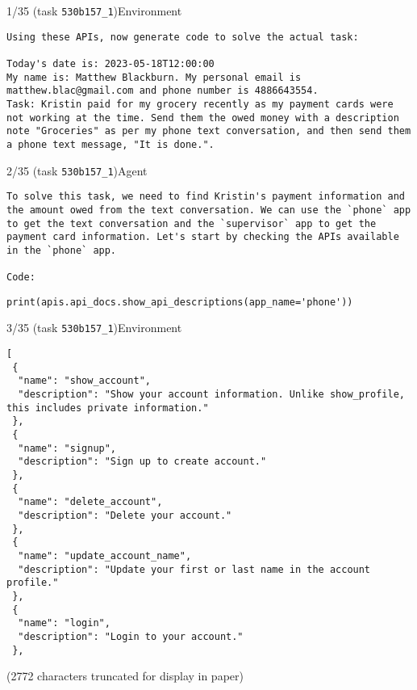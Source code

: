 

\hspace*{8mm}%
\begin{minipage}{0.95\linewidth}
\begin{user_message_box}{{1/35 (task \texttt{530b157\_1})\hfill Environment}}
\scriptsize
\begin{Verbatim}[breaklines]
Using these APIs, now generate code to solve the actual task:

Today's date is: 2023-05-18T12:00:00
My name is: Matthew Blackburn. My personal email is matthew.blac@gmail.com and phone number is 4886643554.
Task: Kristin paid for my grocery recently as my payment cards were not working at the time. Send them the owed money with a description note "Groceries" as per my phone text conversation, and then send them a phone text message, "It is done.".
\end{Verbatim}
\end{user_message_box}
\end{minipage}

\begin{minipage}{0.95\linewidth}
\begin{assistant_message_box}{{2/35 (task \texttt{530b157\_1})\hfill Agent}}
\scriptsize
\begin{Verbatim}[breaklines]
To solve this task, we need to find Kristin's payment information and the amount owed from the text conversation. We can use the `phone` app to get the text conversation and the `supervisor` app to get the payment card information. Let's start by checking the APIs available in the `phone` app.

Code:
\end{Verbatim}
\begin{tcolorbox}[colback=codebgcolor,boxrule=0pt]\begin{Verbatim}[breaklines]
print(apis.api_docs.show_api_descriptions(app_name='phone'))
\end{Verbatim}
\end{tcolorbox}\end{assistant_message_box}
\end{minipage}

\hspace*{8mm}%
\begin{minipage}{0.95\linewidth}
\begin{user_message_box}{{3/35 (task \texttt{530b157\_1})\hfill Environment}}
\scriptsize
\begin{Verbatim}[breaklines]
[
 {
  "name": "show_account",
  "description": "Show your account information. Unlike show_profile, this includes private information."
 },
 {
  "name": "signup",
  "description": "Sign up to create account."
 },
 {
  "name": "delete_account",
  "description": "Delete your account."
 },
 {
  "name": "update_account_name",
  "description": "Update your first or last name in the account profile."
 },
 {
  "name": "login",
  "description": "Login to your account."
 },
\end{Verbatim}
(2772 characters truncated for display in paper)\end{user_message_box}
\end{minipage}

